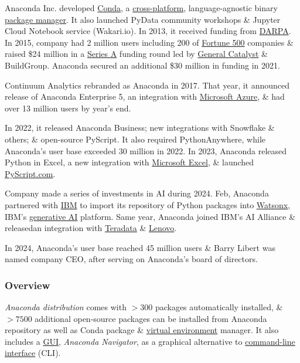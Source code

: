 \documentclass{article}
\begin{document}
Anaconda Inc. developed \href{https://en.wikipedia.org/wiki/Conda_(package_manager)}{Conda}, a \href{https://en.wikipedia.org/wiki/Cross-platform}{cross-platform}, language-agnostic binary \href{https://en.wikipedia.org/wiki/Package_manager}{package manager}. It also launched PyData community workshops \& Jupyter Cloud Notebook service (Wakari.io). In 2013, it received funding from \href{https://en.wikipedia.org/wiki/DARPA}{DARPA}. In 2015, company had 2 million users including 200 of \href{https://en.wikipedia.org/wiki/Fortune_500}{Fortune 500} companies \& raised \$24 million in a \href{https://en.wikipedia.org/wiki/Series_A}{Series A} funding round led by \href{https://en.wikipedia.org/wiki/General_Catalyst}{General Catalyst} \& BuildGroup. Anaconda secured an additional \$30 million in funding in 2021.

Continuum Analytics rebranded as Anaconda in 2017. That year, it announced release of Anaconda Enterprise 5, an integration with \href{https://en.wikipedia.org/wiki/Microsoft_Azure}{Microsoft Azure}, \& had over 13 million users by year's end.

In 2022, it released Anaconda Business; new integrations with Snowflake \& others; \& open-source PyScript. It also required PythonAnywhere, while Anaconda's user base exceeded 30 million in 2022. In 2023, Anaconda released Python in Excel, a new integration with \href{https://en.wikipedia.org/wiki/Microsoft_Excel}{Microsoft Excel}, \& launched \url{PyScript.com}.

Company made a series of investments in AI during 2024. Feb, Anaconda partnered with \href{https://en.wikipedia.org/wiki/IBM}{IBM} to import its repository of Python packages into \href{https://en.wikipedia.org/wiki/Watsonx}{Watsonx}, IBM's \href{https://en.wikipedia.org/wiki/Generative_AI}{generative AI} platform. Same year, Anaconda joined IBM's AI Alliance \& releasedan integration with \href{https://en.wikipedia.org/wiki/Teradata}{Teradata} \& \href{https://en.wikipedia.org/wiki/Lenovo}{Lenovo}.

In 2024, Anaconda's user base reached 45 million users \& {\sc Barry Libert} was named company CEO, after serving on Anaconda's board of directors.

\subsubsection{Overview}
{\it Anaconda distribution} comes with $> 300$ packages automatically installed, \& $> 7500$ additional open-source packages can be installed from Anaconda repository as well as Conda package \& \href{https://en.wikipedia.org/wiki/Virtual_environment_software}{virtual environment} manager. It also includes a \href{https://en.wikipedia.org/wiki/Graphical_user_interface}{GUI}, {\it Anaconda Navigator}, as a graphical alternative to \href{https://en.wikipedia.org/wiki/Command-line_interface}{command-line interface} (CLI).
\end{document}
